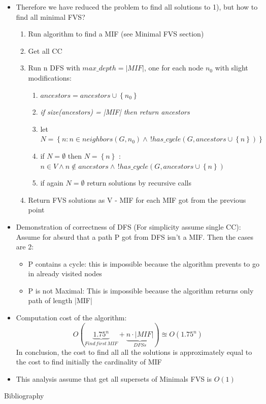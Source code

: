 \documentclass[11pt]{beamer}
\begin{document}
	\begin{frame}
		\begin{itemize}
			\item Therefore we have reduced the problem to find all solutions to 1), but how to find all minimal FVS?
			\begin{enumerate}
				\item Run algorithm to find a MIF (see Minimal FVS section)
				\item Get all CC
				\item Run n DFS with $ max\_depth=|MIF| $, one for each node $ n_0 $ with slight modifications:
				\begin{enumerate}
					\item $ ancestors = ancestors \cup \left\{ n_0 \right\} $
					\item \textit{if size(ancestors) = |MIF| then return ancestors}
					\item let $ N = \left\{ n: n \in neighbors(G, n_0) \wedge \, !has\_cycle(G, ancestors \cup \left\{ n \right\}) \right\} $
					\item if $ N = \emptyset $ then $ N = \left\{ n \right\}  $ : $ n \in V \wedge n \notin ancestors \wedge \, ! has\_cycle(G, ancestors \cup \left\{ n \right\})$
					\item if again $ N = \emptyset $ return solutions by recursive calls
					
				\end{enumerate}
				\item Return FVS solutions as V - MIF for each MIF got from the previous point
			\end{enumerate}
		\end{itemize}
	\end{frame}
	\begin{frame}
		\begin{itemize}
			\item Demonstration of correctness of DFS (For simplicity assume single CC): Assume for absurd that a path P got from DFS isn't a MIF. Then the cases are 2:
			\begin{itemize}
				\item P contains a cycle: this is impossible because the algorithm prevents to go in already visited nodes
				\item  P is not Maximal: This is impossible because the algorithm returns only path of length |MIF|
			\end{itemize}
			\item Computation cost of the algorithm: $$ O( \underbrace{1.75 ^ n}_{Find \, first \, MIF} + \underbrace{n \cdot |MIF|}_{DFSs})  \approxeq O(1.75^n) $$
			 In conclusion, the cost to find all all the solutions is approximately equal to the cost to find initially the cardinality of MIF
			 \item This analysis assume that get all supersets of Minimals FVS is $ O(1) $ 
		 	\end{itemize}
	\end{frame}
	\begin{frame}{Bibliography}
		\printbibliography
	\end{frame}
\end{document}
